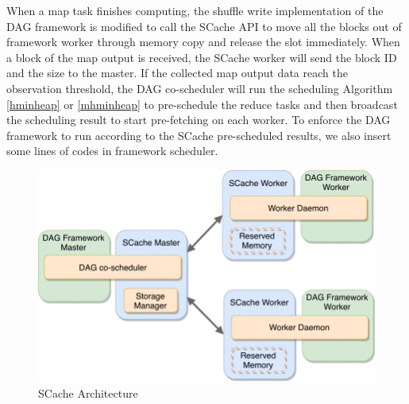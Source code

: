 {\color{black}
When a map task finishes computing, the shuffle write implementation of the DAG framework is modified to call the SCache API to move all the blocks out of framework worker through memory copy and release the slot immediately.
When a block of the map output is received, the SCache worker will send the block ID and the size to the master.
If the collected map output data reach the observation threshold, the DAG co-scheduler will run the scheduling Algorithm \ref{hminheap} or \ref{mhminheap} to pre-schedule the reduce tasks and then broadcast the scheduling result to start pre-fetching on each worker.
To enforce the DAG framework to run according to the SCache pre-scheduled results, we also insert some lines of codes in framework scheduler.
}


\begin{figure}
	\centering
	\includegraphics[width=.7\linewidth]{fig/architecture}
	\caption{\color{black}SCache Architecture}
	\label{fig:architecture}
\end{figure}

